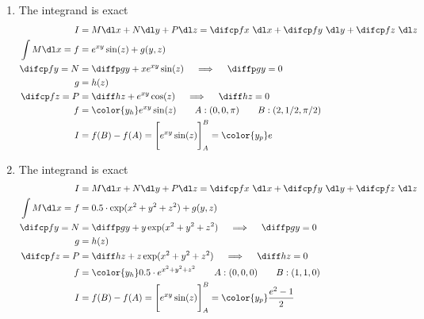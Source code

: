 \begin{enumerate}
    \item The integrand is exact
          \begin{align}
              I                & = M \dl x + N \dl y + P \dl z =
              \difcp fx\ \dl x + \difcp fy\ \dl y + \difcp fz\ \dl z             \\
              \int M \dl x = f & = e^{xy}\sin(z) + g(y, z)                       \\
              \difcp fy = N    & = \diffp gy + xe^{xy}\sin(z)
              \quad \implies \quad  \diffp gy = 0                                \\
              g                & = h(z)                                          \\
              \difcp fz = P    & = \diff hz + e^{xy} \cos(z)
              \quad \implies \quad \diff hz = 0                                  \\
              f                & = {\color{y_h} e^{xy} \sin(z)}
              \qquad A : (0, 0, \pi) \qquad B: (2, 1/2, \pi/2)                   \\
              I                & = f(B) - f(A) = \Bigg[ e^{xy}\sin(z) \Bigg]_A^B
              = \color{y_p} e
          \end{align}

    \item The integrand is exact
          \begin{align}
              I                & = M \dl x + N \dl y + P \dl z =
              \difcp fx\ \dl x + \difcp fy\ \dl y
              + \difcp fz\ \dl z                                                 \\
              \int M \dl x = f & = 0.5 \cdot \exp(x^2 + y^2 + z^2) + g(y, z)     \\
              \difcp fy = N    & = \diffp gy + y\exp(x^2 + y^2 + z^2)
              \quad \implies \quad  \diffp gy = 0                                \\
              g                & = h(z)                                          \\
              \difcp fz = P    & = \diff hz + z \exp(x^2 + y^2 + z^2)
              \quad \implies \quad \diff hz = 0                                  \\
              f                & = {\color{y_h} 0.5 \cdot e^{x^2 + y^2 + z^2}}
              \qquad A : (0, 0, 0) \qquad B: (1, 1, 0)                           \\
              I                & = f(B) - f(A) = \Bigg[ e^{xy}\sin(z) \Bigg]_A^B
              = \color{y_p} \frac{e^2 - 1}{2}
          \end{align}


\end{enumerate}

